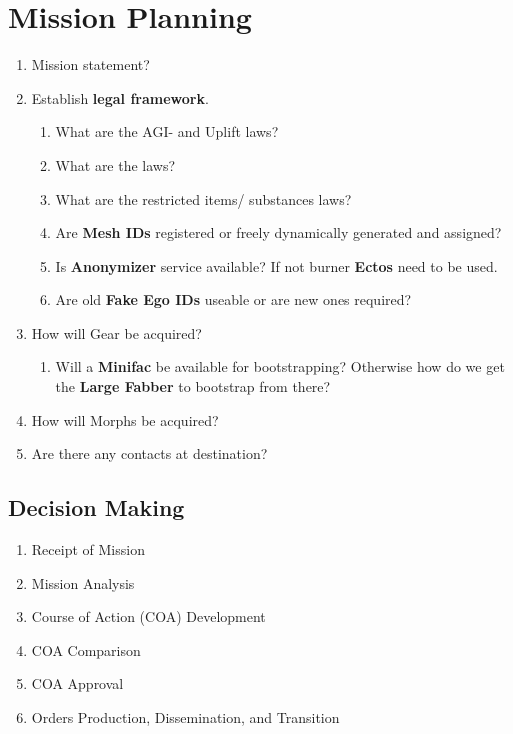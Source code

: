 
\section{Mission Planning}

\begin{enumerate}
    \item Mission statement?
    \item Establish \textbf{legal framework}. 
    \begin{enumerate}
        \item What are the AGI- and Uplift laws?
        \item What are the  laws?
        \item What are the restricted items/ substances laws?
        \item Are \textbf{\glspl{Mesh ID}} registered or freely dynamically generated and assigned?
        \item Is \textbf{\gls{Anonymizer}} service available? If not burner \textbf{\glspl{Ecto}} need to be used.
        \item Are old \textbf{\glspl{Fake Ego ID}} useable or are new ones required?
    \end{enumerate}
    \item How will Gear be acquired?
    \begin{enumerate}
        \item Will a \textbf{\gls{Minifac}} be available for bootstrapping? Otherwise how do we get the \textbf{\gls{Large Fabber}} to bootstrap from there?
    \end{enumerate}
    \item How will Morphs be acquired?
    \item Are there any contacts at destination?
\end{enumerate}


\subsection{Decision Making}

\begin{enumerate}
    \item Receipt of Mission
    \item Mission Analysis
    \item Course of Action (COA) Development
    \item COA Comparison
    \item COA Approval
    \item Orders Production, Dissemination, and Transition
\end{enumerate}


